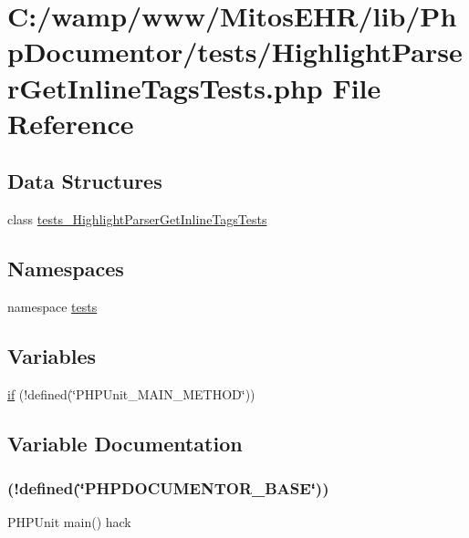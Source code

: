 \hypertarget{_highlight_parser_get_inline_tags_tests_8php}{\section{\-C\-:/wamp/www/\-Mitos\-E\-H\-R/lib/\-Php\-Documentor/tests/\-Highlight\-Parser\-Get\-Inline\-Tags\-Tests.php \-File \-Reference}
\label{_highlight_parser_get_inline_tags_tests_8php}
}
\subsection*{\-Data \-Structures}
\begin{DoxyCompactItemize}
\item 
class \hyperlink{classtests___highlight_parser_get_inline_tags_tests}{tests\-\_\-\-Highlight\-Parser\-Get\-Inline\-Tags\-Tests}
\end{DoxyCompactItemize}
\subsection*{\-Namespaces}
\begin{DoxyCompactItemize}
\item 
namespace \hyperlink{namespacetests}{tests}
\end{DoxyCompactItemize}
\subsection*{\-Variables}
\begin{DoxyCompactItemize}
\item 
\hyperlink{_highlight_parser_get_inline_tags_tests_8php_ae3cacee49c3c7d622bb92397daeb7733}{if} (!defined(\char`\"{}\-P\-H\-P\-Unit\-\_\-\-M\-A\-I\-N\-\_\-\-M\-E\-T\-H\-O\-D\char`\"{}))
\end{DoxyCompactItemize}


\subsection{\-Variable \-Documentation}
\hypertarget{_highlight_parser_get_inline_tags_tests_8php_ae3cacee49c3c7d622bb92397daeb7733}{
\subsubsection[{if}]{(!defined(\char`\"{}\-P\-H\-P\-D\-O\-C\-U\-M\-E\-N\-T\-O\-R\-\_\-\-B\-A\-S\-E\char`\"{}))}}\label{_highlight_parser_get_inline_tags_tests_8php_ae3cacee49c3c7d622bb92397daeb7733}
\-P\-H\-P\-Unit main() hack

